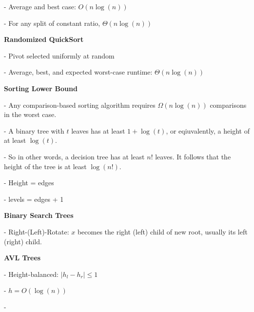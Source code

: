 \documentclass[8pt, letterpaper]{extarticle}
\begin{document}
\begin{minipage}[t]{0.45\textwidth}
- Average and best case: $O(n\log(n))$

- For any split of constant ratio, $\Theta(n\log(n))$

{\small \textbf{Randomized QuickSort}}

- Pivot selected uniformly at random

- Average, best, and expected worst-case runtime: $\Theta(n\log(n))$

\textbf{Sorting Lower Bound}

- Any comparison-based sorting algorithm requires $\Omega(n\log(n))$ comparisons in the worst case.

- A binary tree with $t$ leaves has at least $1 + \log(t)$, or eqiuvalently, a height of at least $\log(t)$.

- So in other words, a decision tree has at least $n!$ leaves. It follows that the height of the tree is at least $\log(n!)$.

- Height = edges

- levels = edges + 1

\textbf{Binary Search Trees}

- Right-(Left)-Rotate: $x$ becomes the right (left) child of new root, usually its left (right) child.

\textbf{AVL Trees}

- Height-balanced: $|h_l - h_r| \leq 1$

- $h = O(\log(n))$

- 

\end{minipage}
\end{document}
